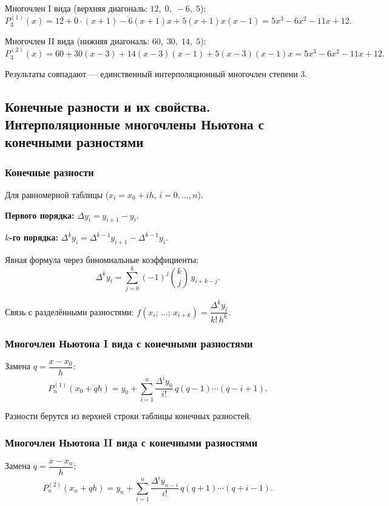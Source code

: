Многочлен I вида (верхняя диагональ: $12,\; 0,\; -6,\; 5$):
\[
    P_3^{(1)}(x) = 12 + 0 \cdot (x+1) - 6(x+1)x + 5(x+1)x(x-1) = 5x^3 - 6x^2 - 11x + 12.
\]

Многочлен II вида (нижняя диагональ: $60,\; 30,\; 14,\; 5$):
\[
    P_3^{(2)}(x) = 60 + 30(x-3) + 14(x-3)(x-1) + 5(x-3)(x-1)x = 5x^3 - 6x^2 - 11x + 12.
\]

Результаты совпадают --- единственный интерполяционный многочлен степени 3.


\subsection{Конечные разности и их свойства. Интерполяционные многочлены Ньютона с конечными разностями}

\subsubsection*{Конечные разности}

Для равномерной таблицы ($x_i = x_0 + ih$, $i = 0, \ldots, n$).

\textbf{Первого порядка:} $\Delta y_i = y_{i+1} - y_i$.

\textbf{$k$-го порядка:} $\Delta^k y_i = \Delta^{k-1} y_{i+1} - \Delta^{k-1} y_i$.

Явная формула через биномиальные коэффициенты:
\[
    \Delta^k y_i = \sum_{j=0}^{k} (-1)^j \binom{k}{j}\, y_{i+k-j}.
\]

Связь с разделёнными разностями: $f(x_i;\, \ldots;\, x_{i+k}) = \dfrac{\Delta^k y_i}{k!\, h^k}$.

\subsubsection*{Многочлен Ньютона I вида с конечными разностями}

Замена $q = \dfrac{x - x_0}{h}$:
\[
    P_n^{(1)}(x_0 + qh) = y_0 + \sum_{i=1}^{n} \frac{\Delta^i y_0}{i!}\, q(q-1) \cdots (q-i+1).
\]

Разности берутся из верхней строки таблицы конечных разностей.

\subsubsection*{Многочлен Ньютона II вида с конечными разностями}

Замена $q = \dfrac{x - x_n}{h}$:
\[
    P_n^{(2)}(x_n + qh) = y_n + \sum_{i=1}^{n} \frac{\Delta^i y_{n-i}}{i!}\, q(q+1) \cdots (q+i-1).
\]

